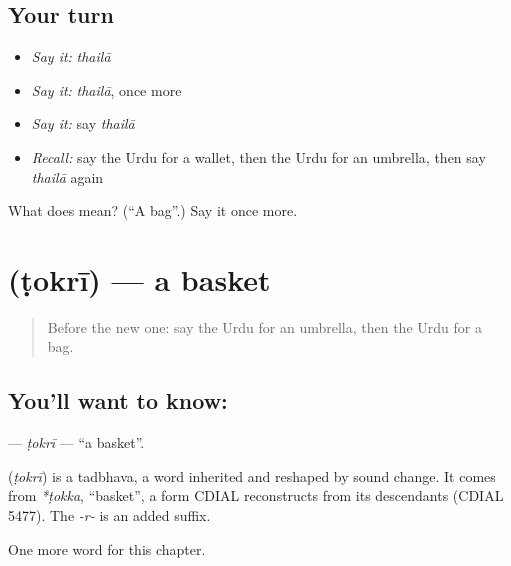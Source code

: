 \subsection*{Your turn}
\begin{itemize}
\raggedright
  \item \emph{Say it:} \emph{thailā}
  \item \emph{Say it:} \emph{thailā}, once more
  \item \emph{Say it:} say \emph{thailā}
  \item \emph{Recall:} say the Urdu for a wallet, then the Urdu for an umbrella, then say \emph{thailā} again
\end{itemize}

\begin{tcolorbox}[breakable,colback=teal!4,colframe=teal!35!black,title={Before you move on}]
What does  mean? (\textquotedblleft{}A bag\textquotedblright{}.) Say it once more.
\end{tcolorbox}
\section[\texorpdfstring{\ur{ٹوکری} (ṭokrī)}{ٹوکری (ṭokrī)}]{ (ṭokrī) — a basket}

\label{lesson:UR-C111-tokri}



\begin{quote}
Before the new one: say the Urdu for an umbrella, then the Urdu for a bag.
\end{quote}

\subsection*{You'll want to know: }
\textbf{} — \emph{ṭokrī} — \textquotedblleft{}a basket\textquotedblright{}.

\begin{cousinweb}
\textbf{} (\emph{ṭokrī}) is a tadbhava, a word inherited and reshaped by sound change. It comes from \emph{*ṭokka}, \textquotedblleft{}basket\textquotedblright{}, a form CDIAL reconstructs from its descendants (CDIAL 5477). The \emph{-r-} is an added suffix.
\end{cousinweb}

\begin{grammarlens}[title={What you've built}]
One more word for this chapter.
\end{grammarlens}

